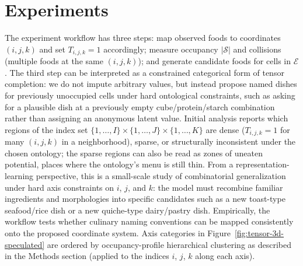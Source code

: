 \section{Experiments}

The experiment workflow has three steps: map observed foods to coordinates $(i,j,k)$ and set $T_{i,j,k}=1$ accordingly; measure occupancy $|\mathcal{S}|$ and collisions (multiple foods at the same $(i,j,k)$); and generate candidate foods for cells in $\mathcal{E}$.
The third step can be interpreted as a constrained categorical form of tensor completion: we do not impute arbitrary values, but instead propose named dishes for previously unoccupied cells under hard ontological constraints, such as asking for a plausible dish at a previously empty cube/protein/starch combination rather than assigning an anonymous latent value.
Initial analysis reports which regions of the index set $\{1,\ldots,I\} \times \{1,\ldots,J\} \times \{1,\ldots,K\}$ are dense ($T_{i,j,k}=1$ for many $(i,j,k)$ in a neighborhood), sparse, or structurally inconsistent under the chosen ontology; the sparse regions can also be read as zones of uneaten potential, places where the ontology's menu is still thin.
From a representation-learning perspective, this is a small-scale study of combinatorial generalization under hard axis constraints on $i$, $j$, and $k$: the model must recombine familiar ingredients and morphologies into specific candidates such as a new toast-type seafood/rice dish or a new quiche-type dairy/pastry dish.
Empirically, the workflow tests whether culinary naming conventions can be mapped consistently onto the proposed coordinate system.
Axis categories in Figure~\ref{fig:tensor-3d-speculated} are ordered by occupancy-profile hierarchical clustering as described in the Methods section (applied to the indices $i$, $j$, $k$ along each axis).


